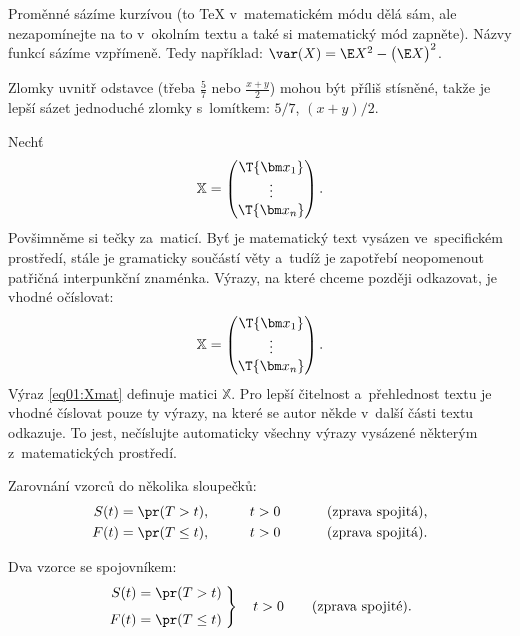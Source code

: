 Proměnné sázíme kurzívou (to \TeX{} v~matematickém módu dělá sám, ale
nezapomínejte na to v~okolním textu a také si matematický mód zapněte).
Názvy funkcí sázíme vzpřímeně. Tedy například:
$\var(X) = \E X^2 - \bigl(\E X \bigr)^2$.

Zlomky uvnitř odstavce (třeba $\frac{5}{7}$ nebo $\frac{x+y}{2}$) mohou
být příliš stísněné, takže je lepší sázet jednoduché zlomky s~lomítkem:
$5/7$, $(x+y)/2$.

Nechť
\[   %
  \mathbb{X} = \begin{pmatrix}
    \T{\bm x_1} \\
    \vdots      \\
    \T{\bm x_n}
  \end{pmatrix}.
\]
Povšimněme si tečky za~maticí. Byť je matematický text vysázen
ve~specifickém prostředí, stále je gramaticky součástí věty a~tudíž je
zapotřebí neopomenout patřičná interpunkční znaménka. Výrazy, na které
chceme později odkazovat, je vhodné očíslovat:
\begin{equation}\label{eq01:Xmat}
  \mathbb{X} = \begin{pmatrix}
    \T{\bm x_1} \\
    \vdots      \\
    \T{\bm x_n}
  \end{pmatrix}.
\end{equation}
Výraz \eqref{eq01:Xmat} definuje matici $\mathbb{X}$. Pro lepší čitelnost
a~přehlednost textu je vhodné číslovat pouze ty výrazy, na které se
autor někde v~další části textu odkazuje. To jest, nečíslujte
automaticky všechny výrazy vysázené některým z~matematických
prostředí.

Zarovnání vzorců do několika sloupečků:
\begin{alignat*}{3}
  S(t) & = \pr(T > t),    & \qquad t & >0 & \qquad & \text{ (zprava spojitá),} \\
  F(t) & = \pr(T \leq t), & \qquad t & >0 & \qquad & \text{ (zprava spojitá).}
\end{alignat*}

Dva vzorce se spojovníkem:
\begin{equation}\label{eq01:FS}
  \left.
  \begin{aligned}
    S(t) & = \pr(T > t)    \\[1ex]
    F(t) & = \pr(T \leq t)
  \end{aligned}
  \;	%
  \right\}
  \quad t>0 \qquad \text{(zprava spojité).}
\end{equation}

